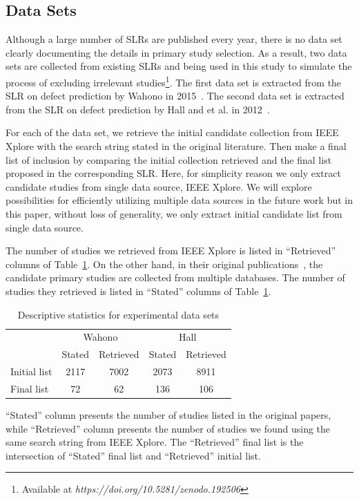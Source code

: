 \documentclass[final,twocolumn,5p]{elsarticle}
\theoremstyle{break}
\begin{document}
\subsection{Data Sets}
\label{sect: Data Sets}

Although a large number of SLRs are published every year, there is no data set clearly documenting the details in primary study selection. As a result, two data sets are collected from existing SLRs and being used in this study to simulate the process of excluding irrelevant studies\footnote{Available at \textit{https://doi.org/10.5281/zenodo.192506}}. The first data set is extracted from the SLR on defect prediction by Wahono in 2015~\cite{wahono2015systematic}. The second data set is extracted from the SLR on defect prediction by Hall and et al. in 2012~\cite{hall2012systematic}. 

For each of the data set, we retrieve the initial candidate collection from IEEE Xplore with the search string stated in the original literature. Then make a final list of inclusion by comparing the initial collection retrieved and the final list proposed in the corresponding SLR. Here, for simplicity reason we only extract candidate studies from single data source, IEEE Xplore. We will explore possibilities for efficiently utilizing multiple data sources in the future work but in this paper, without loss of generality, we only extract initial candidate list from single data source. 

The number of studies we retrieved from IEEE Xplore is listed in ``Retrieved'' columns of Table~\ref{tab: number}. On the other hand, in their original publications~\cite{wahono2015systematic,hall2012systematic}, the candidate primary studies are collected from multiple databases. The number of studies they retrieved is listed in ``Stated'' columns of Table~\ref{tab: number}.

\begin{table}
\caption{Descriptive statistics for experimental data sets}
\label{tab: number}
\begin{center}
\begin{tabular}{ |l|c|c|c|c| }
  \hline
   & \multicolumn{2}{|c|}{Wahono} & \multicolumn{2}{|c|}{Hall}\\
  \cline{2-5}
  & Stated & Retrieved & Stated & Retrieved\\
  \hline
  Initial list & 2117 & 7002 & 2073 & 8911\\
  \hline
  Final list & 72 & 62 & 136 & 106 \\
  \hline
\end{tabular}
\end{center}
{\footnotesize ``Stated'' column presents the number of studies listed in the original papers, while ``Retrieved'' column presents the number of studies we found using the same search string from IEEE Xplore. The ``Retrieved'' final list is the intersection of ``Stated'' final list and ``Retrieved'' initial list.}
\end{table}
\end{document}
